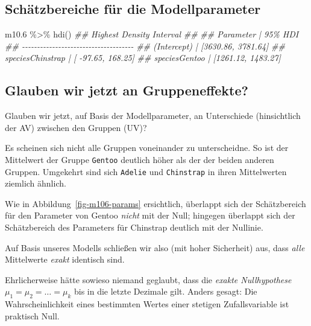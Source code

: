 \documentclass[
  a4paper,
  DIV=11]{scrreprt}
\newenvironment{Shaded}{\begin{snugshade}}{\end{snugshade}}
\newcommand{\DocumentationTok}[1]{\textcolor[rgb]{0.37,0.37,0.37}{\textit{#1}}}
\newcommand{\FloatTok}[1]{\textcolor[rgb]{0.68,0.00,0.00}{#1}}
\newcommand{\FunctionTok}[1]{\textcolor[rgb]{0.28,0.35,0.67}{#1}}
\newcommand{\NormalTok}[1]{\textcolor[rgb]{0.00,0.23,0.31}{#1}}
\newcommand{\SpecialCharTok}[1]{\textcolor[rgb]{0.37,0.37,0.37}{#1}}
\theoremstyle{definition}
\theoremstyle{remark}
\begin{document}
\hypertarget{schuxe4tzbereiche-fuxfcr-die-modellparameter}{%
\subsection{Schätzbereiche für die
Modellparameter}\label{schuxe4tzbereiche-fuxfcr-die-modellparameter}}

\begin{Shaded}
\begin{Highlighting}[]
\NormalTok{m10}\FloatTok{.6} \SpecialCharTok{\%\textgreater{}\%} 
  \FunctionTok{hdi}\NormalTok{()}
\DocumentationTok{\#\# Highest Density Interval}
\DocumentationTok{\#\# }
\DocumentationTok{\#\# Parameter        |            95\% HDI}
\DocumentationTok{\#\# {-}{-}{-}{-}{-}{-}{-}{-}{-}{-}{-}{-}{-}{-}{-}{-}{-}{-}{-}{-}{-}{-}{-}{-}{-}{-}{-}{-}{-}{-}{-}{-}{-}{-}{-}{-}{-}}
\DocumentationTok{\#\# (Intercept)      | [3630.86, 3781.64]}
\DocumentationTok{\#\# speciesChinstrap | [ {-}97.65,  168.25]}
\DocumentationTok{\#\# speciesGentoo    | [1261.12, 1483.27]}
\end{Highlighting}
\end{Shaded}

\hypertarget{glauben-wir-jetzt-an-gruppeneffekte}{%
\subsection{Glauben wir jetzt an
Gruppeneffekte?}\label{glauben-wir-jetzt-an-gruppeneffekte}}

Glauben wir jetzt, auf Basis der Modellparameter, an Unterschiede
(hinsichtlich der AV) zwischen den Gruppen (UV)?

Es scheinen sich nicht alle Gruppen voneinander zu unterscheidne. So ist
der Mittelwert der Gruppe \texttt{Gentoo} deutlich höher als der der
beiden anderen Gruppen. Umgekehrt sind sich \texttt{Adelie} und
\texttt{Chinstrap} in ihren Mittelwerten ziemlich ähnlich.

Wie in Abbildung~\ref{fig-m106-params} ersichtlich, überlappt sich der
Schätzbereich für den Parameter von Gentoo \emph{nicht} mit der Null;
hingegen überlappt sich der Schätzbereich des Parameters für Chinstrap
deutlich mit der Nullinie.

Auf Basis unseres Modells schließen wir also (mit hoher Sicherheit) aus,
dass \emph{alle} Mittelwerte \emph{exakt} identisch sind.

Ehrlicherweise hätte sowieso niemand geglaubt, dass die \emph{exakte
Nullhypothese} \(\mu_1 = \mu_2 = \ldots = \mu_k\) bis in die letzte
Dezimale gilt. Anders gesagt: Die Wahrscheinlichkeit eines bestimmten
Wertes einer stetigen Zufallsvariable ist praktisch Null.
\end{document}
